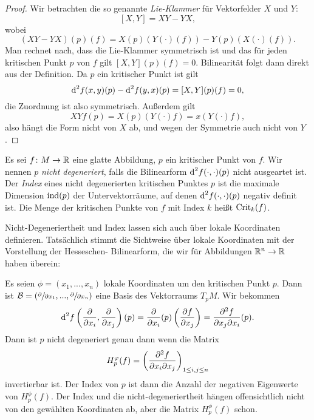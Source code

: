 \begin{proof}
    Wir betrachten die so genannte \textit{Lie-Klammer} für Vektorfelder $X$ und $Y$:
    \[ [X, Y] = XY - YX , \]
    wobei
    \[ (XY - YX) (p) (f) = X(p)(Y(\cdot)(f)) - Y(p)(X(\cdot)(f)) . \]
    Man rechnet nach, dass die Lie-Klammer symmetrisch ist und das für jeden kritischen Punkt $p$
    von $f$ gilt $[X, Y](p)(f) = 0$.
    Bilinearität folgt dann direkt aus der Definition. Da $p$ ein kritischer Punkt ist gilt 
    \[ { \operatorname{d} }^2 f (x, y) (p) - { \operatorname{d} }^2 f (y, x) (p) = [X, Y] (p) (f) = 0, \]
    die Zuordnung ist also symmetrisch. Außerdem gilt
    \[ XY f (p) = X(p) (Y(\cdot) f) = x(Y(\cdot) f), \]
    also hängt die Form nicht von $X$ ab, und wegen der Symmetrie auch nicht von $Y$.
\end{proof}

\begin{definition}
    \label{def: nicht-degeneriert u index}
    Es sei $f \colon M \to { \mathbb R }$ eine glatte Abbildung, $p$ ein kritischer Punkt von
    $f$. Wir nennen $p$ \textit{nicht degeneriert}, falls die Bilinearform 
    ${ \operatorname{d} }^2 f (\cdot, \cdot) (p)$ nicht ausgeartet ist. Der \textit{Index} eines
    nicht degenerierten kritischen Punktes $p$ ist die maximale Dimension ${ \operatorname{ind} } (p)$ der
    Untervektorräume, auf denen ${ \operatorname{d} }^2 f (\cdot, \cdot) (p)$ negativ definit ist.
    Die Menge der kritischen Punkte von $f$ mit Index $k$ heißt ${ \operatorname{Crit} }_k (f)$.
\end{definition}

\begin{remark}
    Nicht-Degeneriertheit und Index lassen sich auch über lokale Koordinaten definieren.
    Tatsächlich stimmt die Sichtweise über lokale Koordinaten mit der Vorstellung der Hesseschen-
    Bilinearform, die wir für Abbildungen ${ \mathbb R }^n \to { \mathbb R }$ haben überein:

    Es seien $\phi = (x_1, ..., x_n)$ lokale Koordinaten um den kritischen Punkt $p$. 
    Dann ist $\mathcal{B} = \left(\pderive{x_1}, ..., \pderive{x_n}\right)$ eine Basis des
    Vektorraums $T_pM$. Wir bekommen
    \[ 
        \opd^2 f \left( \pderive{x_i}, \pderive{x_j} \right) (p) 
        = \pderive{x_i}(p) \left( \pderive[f]{x_j} \right) 
        = \pdderive[f]{x_j}{x_i} (p).
    \]
    Dann ist $p$ nicht degeneriert genau dann wenn die Matrix
    \[ H^\phi_p(f) = \left( \pdderive[f]{x_i}{x_j} \right)_{1 \leq i, j \leq n} \]
    invertierbar ist. Der Index von $p$ ist dann die Anzahl der negativen Eigenwerte
    von $H^\phi_p(f)$. Der Index und die nicht-degeneriertheit hängen offensichtlich
    nicht von den gewählten Koordinaten ab, aber die Matrix $H_p^{\phi}(f)$ schon.
\end{remark}

